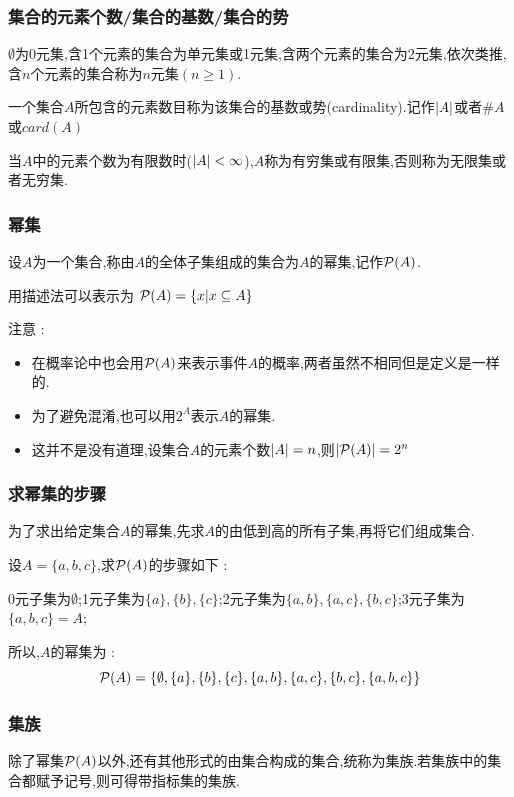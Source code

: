 {{\subsubsection{集合的元素个数/集合的基数/集合的势}{
  $\emptyset$为$0$元集,含1个元素的集合为单元集或1元集,含两个元素的集合为2元集,依次类推,含$n$个元素的集合称为$n$元集$(n \geq 1)$.

  一个集合$A$所包含的元素数目称为该集合的基数或势(cardinality).记作$\left\lvert A \right\vert$或者$\#A$或$card(A)$

  当$A$中的元素个数为有限数时($\left\lvert A \right\vert < \infty$),$A$称为有穷集或有限集,否则称为无限集或者无穷集.
}%

\subsubsection{幂集}{
  设$A$为一个集合,称由$A$的全体子集组成的集合为$A$的幂集,记作$\operatorname{\mathcal{P}} (A)$.

  用描述法可以表示为 $\operatorname{\mathcal{P}} (A) = \{x | x \subseteq A\}$

  注意 :

  \begin{itemize}
    \item 在概率论中也会用$\operatorname{\mathcal{P}} (A)$来表示事件$A$的概率,两者虽然不相同但是定义是一样的.
    \item 为了避免混淆,也可以用$2^A$表示$A$的幂集.
    \item 这并不是没有道理,设集合$A$的元素个数$\left\lvert A \right\vert = n$,则$\left\lvert \operatorname{\mathcal{P}} (A) \right\vert = 2^n$
  \end{itemize}
}%

\subsubsection{求幂集的步骤}{
  为了求出给定集合$A$的幂集,先求$A$的由低到高的所有子集,再将它们组成集合.

  设$A = \{a,b,c\}$,求$\operatorname{\mathcal{P}} (A)$的步骤如下 :

  0元子集为$\emptyset$;1元子集为$\{a\},\{b\},\{c\}$;2元子集为$\{a,b\},\{a,c\},\{b,c\}$;3元子集为$\{a,b,c\} = A$;

  所以,$A$的幂集为 : $$
    \operatorname{\mathcal{P}} (A) = \{\emptyset,\{a\},\{b\},\{c\},\{a,b\},\{a,c\},\{b,c\},\{a,b,c\}\}
  $$
}%

\subsubsection{集族}{
除了幂集$\operatorname{\mathcal{P}} (A)$以外,还有其他形式的由集合构成的集合,统称为集族.若集族中的集合都赋予记号,则可得带指标集的集族.

}}}
